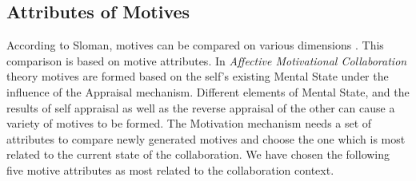 \documentclass[12pt]{report}
\begin{document}
\subsection{Attributes of Motives}
\label{section-motive-attributes}

According to Sloman, motives can be compared on various dimensions
\cite{sloman:motivation}. This comparison is based on motive attributes. In
\textit{Affective Motivational Collaboration} theory motives are formed based
on the self's existing Mental State under the influence of the Appraisal
mechanism. Different elements of Mental State, and the results of self appraisal
as well as the reverse appraisal of the other can cause a variety of motives to
be formed. The Motivation mechanism needs a set of attributes to compare newly
generated motives and choose the one which is most related to the current state
of the collaboration. We have chosen the following five motive attributes as
most related to the collaboration context.
\end{document}
